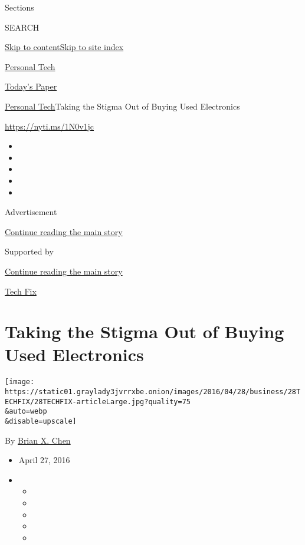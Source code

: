 Sections

SEARCH

\protect\hyperlink{site-content}{Skip to
content}\protect\hyperlink{site-index}{Skip to site index}

\href{https://www.nytimes3xbfgragh.onion/section/technology/personaltech}{Personal
Tech}

\href{https://myaccount.nytimes3xbfgragh.onion/auth/login?response_type=cookie\&client_id=vi}{}

\href{https://www.nytimes3xbfgragh.onion/section/todayspaper}{Today's
Paper}

\href{/section/technology/personaltech}{Personal Tech}\textbar{}Taking
the Stigma Out of Buying Used Electronics

\href{https://nyti.ms/1N0v1jc}{https://nyti.ms/1N0v1jc}

\begin{itemize}
\item
\item
\item
\item
\item
\end{itemize}

Advertisement

\protect\hyperlink{after-top}{Continue reading the main story}

Supported by

\protect\hyperlink{after-sponsor}{Continue reading the main story}

\href{/column/tech-fix}{Tech Fix}

\hypertarget{taking-the-stigma-out-of-buying-used-electronics}{%
\section{Taking the Stigma Out of Buying Used
Electronics}\label{taking-the-stigma-out-of-buying-used-electronics}}

\texttt{[image: https://static01.graylady3jvrrxbe.onion/images/2016/04/28/business/28TECHFIX/28TECHFIX-articleLarge.jpg?quality=75\\\&auto=webp\\\&disable=upscale]}

By \href{http://www.nytimes3xbfgragh.onion/by/brian-x-chen}{Brian X.
Chen}

\begin{itemize}
\item
  April 27, 2016
\item
  \begin{itemize}
  \item
  \item
  \item
  \item
  \item
  \end{itemize}
\end{itemize}

